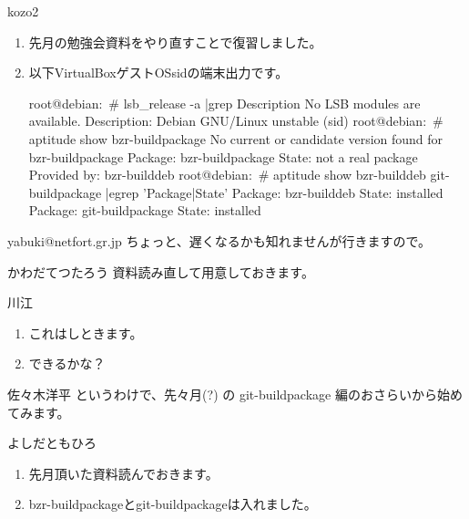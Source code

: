 \documentclass[cjk,dvipdfmx,12pt,%
hyperref={bookmarks=true,bookmarksnumbered=true,bookmarksopen=false,%
colorlinks=false,%
pdftitle={第 51 回 関西 Debian 勉強会},%
pdfauthor={倉敷・のがた・佐々木},%
pdfsubject={資料},%
}]{beamer}
\begin{document}
\begin{frame}[fragile]{ kozo2 }
\begin{enumerate}
\item 先月の勉強会資料をやり直すことで復習しました。
\item 以下VirtualBoxゲストOSsidの端末出力です。
\begin{commandline}
root@debian:~# lsb_release -a |grep Description
No LSB modules are available.
Description: Debian GNU/Linux unstable (sid)
root@debian:~# aptitude show bzr-buildpackage
No current or candidate version found for bzr-buildpackage
Package: bzr-buildpackage
State: not a real package
Provided by: bzr-builddeb
root@debian:~# aptitude show bzr-builddeb git-buildpackage |egrep 'Package|State'
Package: bzr-builddeb
State: installed
Package: git-buildpackage
State: installed
\end{commandline}
\end{enumerate}
\end{frame}

\begin{frame}{ yabuki@netfort.gr.jp }
ちょっと、遅くなるかも知れませんが行きますので。
\end{frame}

\begin{frame}{ かわだてつたろう }
資料読み直して用意しておきます。
\end{frame}

\begin{frame}{ 川江 }
\begin{enumerate}
\item これはしときます。
\item できるかな？
\end{enumerate}
\end{frame}

\begin{frame}{ 佐々木洋平 }
というわけで、先々月(?) の git-buildpackage 編のおさらいから始めてみます。
\end{frame}

\begin{frame}{ よしだともひろ }
\begin{enumerate}
\item 先月頂いた資料読んでおきます。
\item bzr-buildpackageとgit-buildpackageは入れました。
\end{enumerate}
\end{frame}

\end{document}
